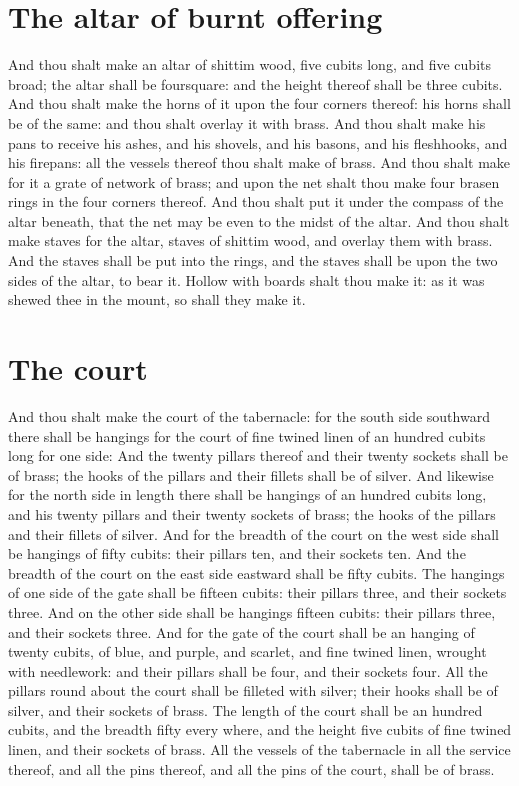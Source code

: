 \section*{The altar of burnt offering}
\begin{biblechapter} %
\verse And thou shalt make an altar of shittim wood, five cubits long, and five cubits broad; the altar shall be foursquare: and the height thereof shall be three cubits.
\verse And thou shalt make the horns of it upon the four corners thereof: his horns shall be of the same: and thou shalt overlay it with brass.
\verse And thou shalt make his pans to receive his ashes, and his shovels, and his basons, and his fleshhooks, and his firepans: all the vessels thereof thou shalt make of brass.
\verse And thou shalt make for it a grate of network of brass; and upon the net shalt thou make four brasen rings in the four corners thereof.
\verse And thou shalt put it under the compass of the altar beneath, that the net may be even to the midst of the altar.
\verse And thou shalt make staves for the altar, staves of shittim wood, and overlay them with brass.
\verse And the staves shall be put into the rings, and the staves shall be upon the two sides of the altar, to bear it.
\verse Hollow with boards shalt thou make it: as it was shewed thee in the mount, so shall they make it.
\section*{The court}
\verse And thou shalt make the court of the tabernacle: for the south side southward there shall be hangings for the court of fine twined linen of an hundred cubits long for one side:
\verse And the twenty pillars thereof and their twenty sockets shall be of brass; the hooks of the pillars and their fillets shall be of silver.
\verse And likewise for the north side in length there shall be hangings of an hundred cubits long, and his twenty pillars and their twenty sockets of brass; the hooks of the pillars and their fillets of silver.
\verse And for the breadth of the court on the west side shall be hangings of fifty cubits: their pillars ten, and their sockets ten.
\verse And the breadth of the court on the east side eastward shall be fifty cubits.
\verse The hangings of one side of the gate shall be fifteen cubits: their pillars three, and their sockets three.
\verse And on the other side shall be hangings fifteen cubits: their pillars three, and their sockets three.
\verse And for the gate of the court shall be an hanging of twenty cubits, of blue, and purple, and scarlet, and fine twined linen, wrought with needlework: and their pillars shall be four, and their sockets four.
\verse All the pillars round about the court shall be filleted with silver; their hooks shall be of silver, and their sockets of brass.
\verse The length of the court shall be an hundred cubits, and the breadth fifty every where, and the height five cubits of fine twined linen, and their sockets of brass.
\verse All the vessels of the tabernacle in all the service thereof, and all the pins thereof, and all the pins of the court, shall be of brass.

\end{biblechapter}
